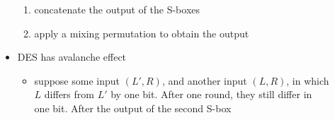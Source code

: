 \documentclass[11pt]{article}
\newcommand{\ee}[1]{\ensuremath{#1}}
\begin{document}
\begin{description}
\begin{itemize}
\begin{enumerate}
 		\item concatenate the output of the S-boxes
 		\item apply a mixing permutation to obtain the output
 		
 	\end{enumerate}
 	\item DES has avalanche effect
 	\begin{itemize}
 		\item suppose some input \ee{(L', R)}, and another input \ee{(L, R)}, in which \ee{L} differs from \ee{L'} by one bit. After one round, they still differ in one bit. After the output of the second S-box
 	\end{itemize}

 \end{itemize}
  

\end{description}
\end{document}
